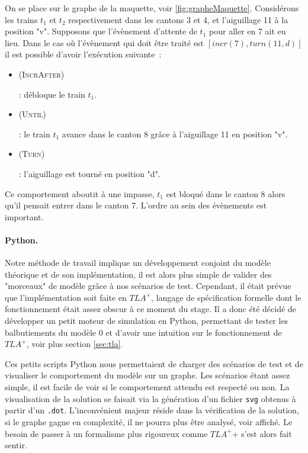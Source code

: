 \documentclass[oneside, a4paper, 11pt]{book}
\newcommand{\todoMV}[2][]{\todo[color=green, #1]{#2}}
\newcommand{\TLA}{\ensuremath{TLA^+}}
\newcommand{\ruleFmt}[1]{\textsc{(#1)}}
\newcommand{\ruleDef}[1]{\hypertarget{#1}{\ruleFmt{#1}}}
\begin{document}
\begin{example}[Atomicité]
	On se place sur le graphe de la maquette, voir \ref{fig:grapheMaquette}. Considérons les trains $t_1$ et $t_2$ respectivement dans les cantons 3 et 4, et l'aiguillage 11 à la position "v". Supposons que l'évènement d'attente de $t_1$ pour aller en 7 ait eu lieu.
	Dans le cas où l'évènement qui doit être traité est $[incr(7),turn(11,d)]$ il est possible d'avoir l'exécution suivante~:
	\begin{itemize}
		\item \ruleDef{IncrAfter} : débloque le train $t_1$.
		\item \ruleDef{Until} : le train $t_1$ avance dans le canton 8 grâce à l'aiguillage 11 en position "v".
		\item \ruleDef{Turn} : l'aiguillage est tourné en position "d".
	\end{itemize}
	Ce comportement aboutit à une impasse, $t_1$ est bloqué dans le canton 8 alors qu'il pensait entrer dans le canton 7. L'ordre au sein des évènements est important.
\end{example}


\paragraph{Python.}
Notre méthode de travail implique un développement conjoint du modèle théorique et de son implémentation, il est alors plus simple de valider des "morceaux" de modèle grâce à nos scénarios de test.
Cependant, il était prévue\todoMV{ortho} que l'implémentation soit faite en \TLA, langage de spécification formelle dont le fonctionnement était assez obscur à ce moment du stage.
Il a donc été décidé de développer un petit\todoMV{"un moteur"} moteur de simulation en Python, permettant de tester les balbutiements du modèle 0 et d'avoir une intuition sur le fonctionnement de \TLA, voir plus section \ref{sec:tla}.


\begin{figure}
\end{figure}

Ces petits\todoMV{"Ces scripts"} scripts Python nous permettaient de charger des scénarios de test et de visualiser le comportement du modèle sur un graphe. Les scénarios étant assez simple, il est facile de voir si le comportement attendu est respecté ou non.
La visualisation de la solution se faisait via la génération d'un fichier \texttt{svg} obtenus à partir d'un \texttt{.dot}. L'inconvénient majeur réside dans la vérification de la solution, si le graphe gagne en complexité, il ne pourra plus être analysé, voir affiché.
Le besoin de passer à un formalisme plus rigoureux comme \TLA+ s'est alors fait sentir.
\end{document}
